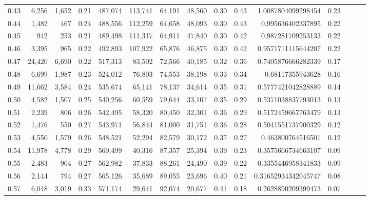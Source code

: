 \begin{tabular}{rrrrrrrrrrrrrrr}
0.43 &   6,256 &   1,652 &  0.21 &  487,074 &  113,741 &   64,191 &   48,560 &  0.30 &  0.43 &      1.0087804099298454 &      0.23 \\
0.44 &   1,482 &     467 &  0.24 &  488,556 &  112,259 &   64,658 &   48,093 &  0.30 &  0.43 &       0.995636402337895 &      0.22 \\
0.45 &     942 &     253 &  0.21 &  489,498 &  111,317 &   64,911 &   47,840 &  0.30 &  0.42 &       0.987281709253133 &      0.22 \\
0.46 &   3,395 &     965 &  0.22 &  492,893 &  107,922 &   65,876 &   46,875 &  0.30 &  0.42 &      0.9571711115644207 &      0.22 \\
0.47 &  24,420 &   6,690 &  0.22 &  517,313 &   83,502 &   72,566 &   40,185 &  0.32 &  0.36 &      0.7405876666282339 &      0.17 \\
0.48 &   6,699 &   1,987 &  0.23 &  524,012 &   76,803 &   74,553 &   38,198 &  0.33 &  0.34 &        0.68117355943628 &      0.16 \\
0.49 &  11,662 &   3,584 &  0.24 &  535,674 &   65,141 &   78,137 &   34,614 &  0.35 &  0.31 &      0.5777421042828889 &      0.14 \\
0.50 &   4,582 &   1,507 &  0.25 &  540,256 &   60,559 &   79,644 &   33,107 &  0.35 &  0.29 &      0.5371038837793013 &      0.13 \\
0.51 &   2,239 &     806 &  0.26 &  542,495 &   58,320 &   80,450 &   32,301 &  0.36 &  0.29 &      0.5172459667763479 &      0.13 \\
0.52 &   1,476 &     550 &  0.27 &  543,971 &   56,844 &   81,000 &   31,751 &  0.36 &  0.28 &      0.5041551737900329 &      0.12 \\
0.53 &   4,550 &   1,579 &  0.26 &  548,521 &   52,294 &   82,579 &   30,172 &  0.37 &  0.27 &       0.463800764516501 &      0.12 \\
0.54 &  11,978 &   4,778 &  0.29 &  560,499 &   40,316 &   87,357 &   25,394 &  0.39 &  0.23 &      0.3575666734663107 &      0.09 \\
0.55 &   2,483 &     904 &  0.27 &  562,982 &   37,833 &   88,261 &   24,490 &  0.39 &  0.22 &      0.3355446958341833 &      0.09 \\
0.56 &   2,144 &     794 &  0.27 &  565,126 &   35,689 &   89,055 &   23,696 &  0.40 &  0.21 &     0.31652934342045747 &      0.08 \\
0.57 &   6,048 &   3,019 &  0.33 &  571,174 &   29,641 &   92,074 &   20,677 &  0.41 &  0.18 &      0.2628890209399473 &      0.07 \\

\end{tabular}
